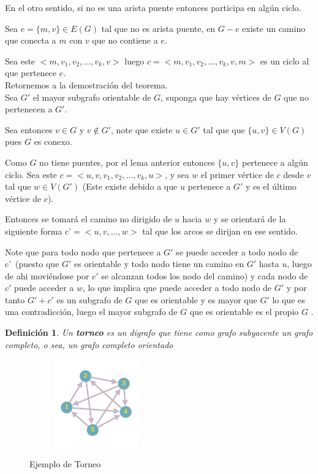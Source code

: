 \documentclass[a4paper,1pt]{report}
\newtheorem*{dfn}{Definición}
\begin{document}
En el otro sentido, si no es una arista puente entonces participa en algún ciclo.

Sea $e=\{m,v\}\in E(G)$ tal que no es arista puente, en $G-e$ existe un camino que conecta a $m$ con $v$ que no contiene a $e$. 

Sea este $<m,v_1,v_2,\dots,v_k,v>$  luego $c=<m,v_1,v_2,\dots,v_k,v,m>$ es un ciclo al que pertenece $e$.\\

Retornemos a la demostración del teorema.\\

Sea $G'$ el mayor subgrafo orientable de $G$, suponga que hay vértices de $G$ que no pertenecen a $G'$.

Sea entonces $v \in G$ y $v \notin G'$, note que existe $u \in G'$ tal que que $\{u,v\}\in V(G)$ pues $G$ es conexo.

Como $G$ no tiene puentes, por el lema anterior entonces $\{u,v\}$ pertenece a algún ciclo. Sea este $c=<u,v,v_1,v_2,\dots,v_k,u>$, y sea $w$ el primer vértice de $c$ desde $v$ tal que $w \in V(G')$ (Este existe debido a que $u$ pertenece a $G'$ y es el último vértice de $c$).

Entonces se tomará el camino no dirigido de $u$ hacia $w$ y se orientar\'a de la siguiente forma c'$=<u,v,\dots,w>$ tal que los arcos se dirijan en ese sentido.

Note que para todo nodo que pertenece a $G'$ se puede acceder a todo nodo de c'~(puesto que $G'$ es orientable y todo nodo tiene un camino en $G'$ hasta $u$, luego de ahi movi\'endose por $c'$ se alcanzan todos los nodo del camino) y cada nodo de $c'$ puede acceder a $w$, lo que implica que puede acceder a todo nodo de $G'$ y por tanto $G'+c'$ es un subgrafo de $G$ que es orientable y es mayor que $G'$ lo que es una contradicción, luego el mayor subgrafo de $G$ que es orientable es el propio $G$ .

\begin{dfn}
 Un \textbf{torneo} es un digrafo que tiene como grafo subyacente un grafo completo, o sea, un grafo completo orientado
\end{dfn}

\begin{figure}[H]
    \centering
    \begin{subfigure}[b]{0.80\textwidth}
        \centering
        \includegraphics[width=0.4\textwidth]{figures8/torneo.png}
    \end{subfigure} 
    \caption{Ejemplo de Torneo}
\end{figure} 
\end{document}
